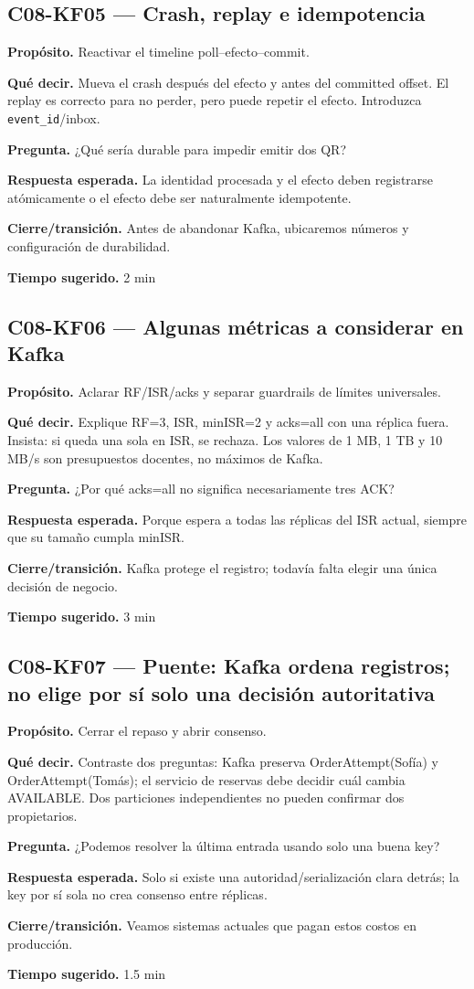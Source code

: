 \documentclass[variant=docente,cover=institutional,mode=screen]{ua-engineering-v6-article}
\newcommand{\FrameField}[2]{\par\noindent\textbf{#1.} #2\par}
\begin{document}
\subsection*{C08-KF05 --- Crash, replay e idempotencia}
\FrameField{Propósito}{Reactivar el timeline poll--efecto--commit.}
\FrameField{Qué decir}{Mueva el crash después del efecto y antes del committed offset. El replay es correcto para no perder, pero puede repetir el efecto. Introduzca \texttt{event\_id}/inbox.}
\FrameField{Pregunta}{¿Qué sería durable para impedir emitir dos QR?}
\FrameField{Respuesta esperada}{La identidad procesada y el efecto deben registrarse atómicamente o el efecto debe ser naturalmente idempotente.}
\FrameField{Cierre/transición}{Antes de abandonar Kafka, ubicaremos números y configuración de durabilidad.}
\FrameField{Tiempo sugerido}{2 min}

\subsection*{C08-KF06 --- Algunas métricas a considerar en Kafka}
\FrameField{Propósito}{Aclarar RF/ISR/acks y separar guardrails de límites universales.}
\FrameField{Qué decir}{Explique RF=3, ISR, minISR=2 y acks=all con una réplica fuera. Insista: si queda una sola en ISR, se rechaza. Los valores de 1 MB, 1 TB y 10 MB/s son presupuestos docentes, no máximos de Kafka.}
\FrameField{Pregunta}{¿Por qué acks=all no significa necesariamente tres ACK?}
\FrameField{Respuesta esperada}{Porque espera a todas las réplicas del ISR actual, siempre que su tamaño cumpla minISR.}
\FrameField{Cierre/transición}{Kafka protege el registro; todavía falta elegir una única decisión de negocio.}
\FrameField{Tiempo sugerido}{3 min}

\subsection*{C08-KF07 --- Puente: Kafka ordena registros; no elige por sí solo una decisión autoritativa}
\FrameField{Propósito}{Cerrar el repaso y abrir consenso.}
\FrameField{Qué decir}{Contraste dos preguntas: Kafka preserva OrderAttempt(Sofía) y OrderAttempt(Tomás); el servicio de reservas debe decidir cuál cambia AVAILABLE. Dos particiones independientes no pueden confirmar dos propietarios.}
\FrameField{Pregunta}{¿Podemos resolver la última entrada usando solo una buena key?}
\FrameField{Respuesta esperada}{Solo si existe una autoridad/serialización clara detrás; la key por sí sola no crea consenso entre réplicas.}
\FrameField{Cierre/transición}{Veamos sistemas actuales que pagan estos costos en producción.}
\FrameField{Tiempo sugerido}{1.5 min}
\end{document}
